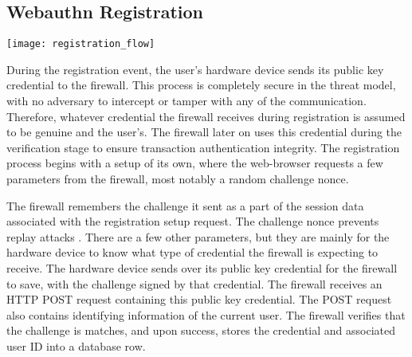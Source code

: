 

\subsection{Webauthn Registration}

\begin{center}
\texttt{[image: registration\_flow]}
\end{center}

During the registration event, the user's hardware device sends its public key credential to the firewall. This process is completely secure in the threat model, with no adversary to intercept or tamper with any of the communication. Therefore, whatever credential the firewall receives during registration is assumed to be genuine and the user's. The firewall later on uses this credential during the verification stage to ensure transaction authentication integrity. The registration process begins with a setup of its own, where the web-browser requests a few parameters from the firewall, most notably a random challenge nonce.


The firewall remembers the challenge it sent as a part of the session data associated with the registration setup request. The challenge nonce prevents replay attacks \cite{TODO-replay-attack}. There are a few other parameters, but they are mainly for the hardware device to know what type of credential the firewall is expecting to receive. The hardware device sends over its public key credential for the firewall to save, with the challenge signed by that credential. The firewall receives an HTTP POST request containing this public key credential. The POST request also contains identifying information of the current user. The firewall verifies that the challenge is matches, and upon success, stores the credential and associated user ID into a database row.

